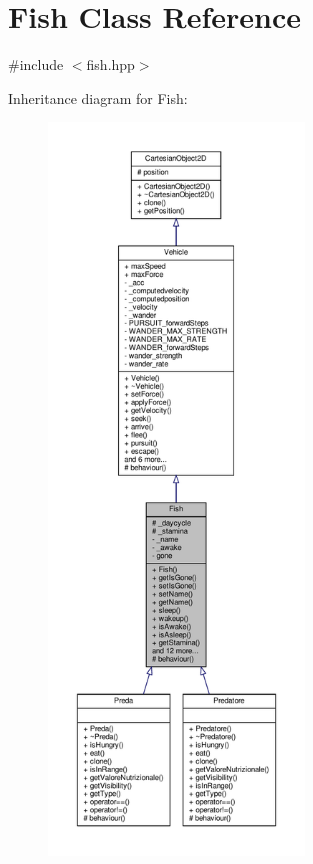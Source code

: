 \hypertarget{classFish}{}\section{Fish Class Reference}
\label{classFish}


{\ttfamily \#include $<$fish.\+hpp$>$}



Inheritance diagram for Fish\+:\nopagebreak
\begin{figure}[H]
\begin{center}
\leavevmode
\includegraphics[height=550pt]{classFish__inherit__graph}
\end{center}
\end{figure}


